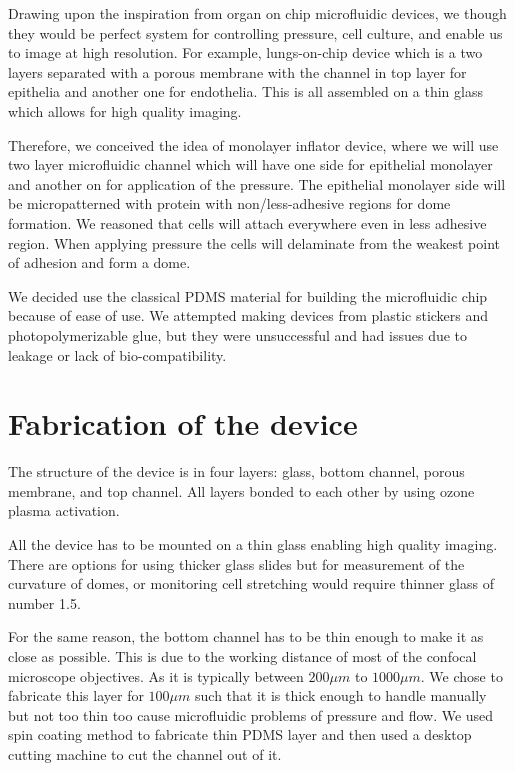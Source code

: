 Drawing upon the inspiration from organ on chip microfluidic devices, we
though they would be perfect system for controlling pressure, cell
culture, and enable us to image at high resolution. For example,
lungs-on-chip device which is a two layers separated with a porous
membrane with the channel in top layer for epithelia and another one for
endothelia. This is all assembled on a thin glass which allows for high
quality imaging.

Therefore, we conceived the idea of monolayer inflator device, where we
will use two layer microfluidic channel which will have one side for
epithelial monolayer and another on for application of the pressure. The
epithelial monolayer side will be micropatterned with protein with
non/less-adhesive regions for dome formation. We reasoned that cells
will attach everywhere even in less adhesive region. When applying
pressure the cells will delaminate from the weakest point of adhesion
and form a dome.

We decided use the classical PDMS material for building the microfluidic
chip because of ease of use. We attempted making devices from plastic
stickers and photopolymerizable glue, but they were unsuccessful and had
issues due to leakage or lack of bio-compatibility.

\hypertarget{fabrication-of-the-device}{%
\section{Fabrication of the device}\label{fabrication-of-the-device}}

The structure of the device is in four layers: glass, bottom channel,
porous membrane, and top channel. All layers bonded to each other by
using ozone plasma activation.

All the device has to be mounted on a thin glass enabling high quality
imaging. There are options for using thicker glass slides but for
measurement of the curvature of domes, or monitoring cell stretching
would require thinner glass of number 1.5.

For the same reason, the bottom channel has to be thin enough to make it
as close as possible. This is due to the working distance of most of the
confocal microscope objectives. As it is typically between \(200\mu m\)
to \(1000 \mu m\). We chose to fabricate this layer for \(100 \mu m\)
such that it is thick enough to handle manually but not too thin too
cause microfluidic problems of pressure and flow. We used spin coating
method to fabricate thin PDMS layer and then used a desktop cutting
machine to cut the channel out of it.

